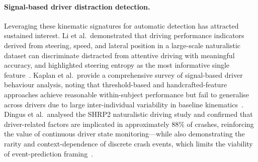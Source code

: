 \paragraph{Signal-based driver distraction detection.}
Leveraging these kinematic signatures for automatic detection has attracted sustained interest.
Li et al.\ demonstrated that driving performance indicators derived from steering, speed, and
lateral position in a large-scale naturalistic dataset can discriminate distracted from
attentive driving with meaningful accuracy, and highlighted steering entropy as the most
informative single feature~\cite{Li2018}.
Kaplan et al.\ provide a comprehensive survey of signal-based driver behaviour analysis,
noting that threshold-based and handcrafted-feature approaches achieve reasonable within-subject
performance but fail to generalise across drivers due to large inter-individual variability
in baseline kinematics~\cite{Kaplan2015}.
Dingus et al.\ analysed the SHRP2 naturalistic driving study and confirmed that
driver-related factors are implicated in approximately 88\% of crashes,
reinforcing the value of continuous driver state monitoring---while also demonstrating
the rarity and context-dependence of discrete crash events, which limits the
viability of event-prediction framing~\cite{Dingus2016}.

